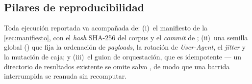 \subsection{Pilares de reproducibilidad}
\label{sec:reprod}

Toda ejecución reportada va acompañada de: (i)~el manifiesto de la
\cref{sec:manifiesto}, con el \emph{hash} SHA-256 del corpus y el \emph{commit}
de ; (ii)~una semilla global () que fija la
ordenación  de \emph{payloads}, la rotación de \emph{User-Agent},
el \emph{jitter} y la mutación de caja; y (iii)~el guion de orquestación, que
es idempotente --- un directorio de resultados existente se omite salvo
, de modo que una barrida interrumpida se reanuda sin
recomputar.
